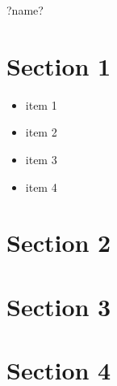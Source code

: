 \documentclass{article}
\begin{document}
\begin{center}
	\Huge ?name?\normalsize
\end{center}

\section*{Section 1}
\begin{itemize}
	\item item 1
	\item item 2
	\item item 3
	\item item 4
\end{itemize}
\section*{Section 2}
\section*{Section 3}
\section*{Section 4}
\end{document}
